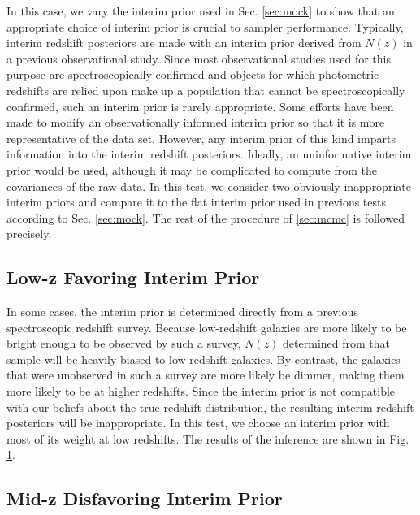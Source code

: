 \documentclass[preprint]{aastex}
\begin{document}
In this case, we vary the interim prior used in Sec. \ref{sec:mock} to show 
that an appropriate choice of interim prior is crucial to sampler performance.  
Typically, interim redshift posteriors are made with an interim prior derived 
from $N(z)$ in a previous observational study.  Since most observational 
studies used for this purpose are spectroscopically confirmed and objects for 
which photometric redshifts are relied upon make up a population that cannot be 
spectroscopically confirmed, such an interim prior is rarely appropriate.  Some 
efforts have been made to modify an observationally informed interim prior so 
that it is more representative of the data set.  \citep{Sheldon2012}  However, 
any interim prior of this kind imparts information into the interim redshift 
posteriors.  Ideally, an uninformative interim prior would be used, although it 
may be complicated to compute from the covariances of the raw data.  In this 
test, we consider two obviously inappropriate interim priors and compare it to 
the flat interim prior used in previous tests according to Sec. \ref{sec:mock}. 
 The rest of the procedure of \ref{sec:mcmc} is followed precisely.

\clearpage
\subsection{Low-z Favoring Interim Prior}
\label{sec:lowz}

In some cases, the interim prior is determined directly from a previous 
spectroscopic redshift survey.  Because low-redshift galaxies are more likely 
to be bright enough to be observed by such a survey, $N(z)$ determined from 
that sample will be heavily biased to low redshift galaxies.  By contrast, the 
galaxies that were unobserved in such a survey are more likely be dimmer, 
making them more likely to be at higher redshifts.  Since the interim prior is 
not compatible with our beliefs about the true redshift distribution, the 
resulting interim redshift posteriors will be inappropriate.  In this test, we 
choose an interim prior with most of its weight at low redshifts.  The results 
of the inference are shown in Fig. \ref{fig:uparam}.

\begin{figure}
\caption{}
\label{fig:uparam}
\end{figure}

\clearpage
\subsection{Mid-z Disfavoring Interim Prior}
\label{sec:midz}
\end{document}
